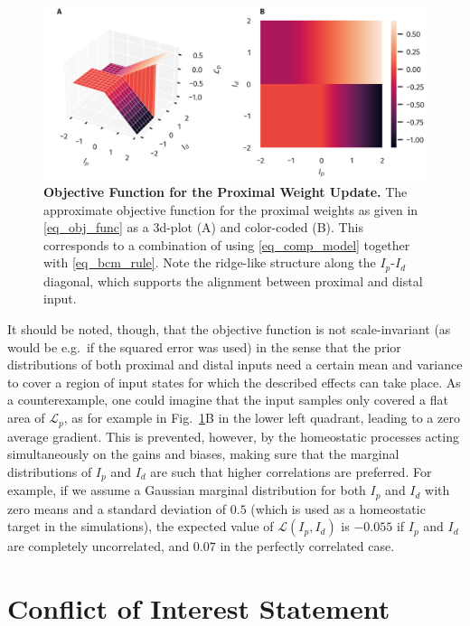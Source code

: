 \documentclass[utf8]{frontiersSCNS} %
\begin{document}
\begin{figure}[t]
\centering
\includegraphics[width=0.9\columnwidth]{obj_func}
\caption{{\bf Objective Function for the Proximal Weight Update.} 
The approximate objective function for the proximal 
weights as given in \eqref{eq_obj_func} as a 3d-plot (A) and color-coded
(B). This corresponds 
to a combination of using \eqref{eq_comp_model} 
together with \eqref{eq_bcm_rule}. Note the ridge-like
structure along the $I_p$-$I_d$ diagonal, which 
supports the alignment between proximal and distal input.}
\label{fig:obj_func}
\end{figure}

It should be noted, though, that the objective function 
is not scale-invariant (as 
would be e.g.\ if the squared error was used) in the 
sense that the prior distributions of both proximal 
and distal inputs need a certain mean and variance to 
cover a region of input states for which the described 
effects can take place. As a counterexample, one could 
imagine that the input samples only covered a flat area of 
$\mathcal{L}_p$, as for example in Fig.~\ref{fig:obj_func}B 
in the lower left quadrant, leading to a zero average gradient. This 
is prevented, however, by the homeostatic processes 
acting simultaneously on the gains
and biases, making sure that the marginal distributions of $I_p$ and
$I_d$ are such that higher correlations are preferred. For example,
if we assume a Gaussian marginal distribution for both $I_p$ and
$I_d$ with zero means and a standard deviation of $0.5$ (which is
used as a homeostatic target in the simulations), the expected value
of $\mathcal{L}(I_p,I_d)$ is $-0.055$ if $I_p$ and
$I_d$ are completely uncorrelated, and $0.07$ in the perfectly correlated 
case.


\section*{Conflict of Interest Statement}
\end{document}
